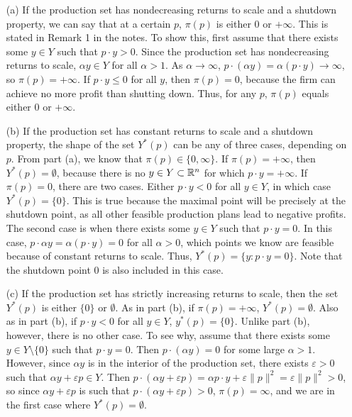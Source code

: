 \documentclass[12pt]{article}
\begin{document}
\begin{itemize}
    \item[(a)] If the production set has nondecreasing returns to scale and a shutdown property, we can say that at a certain $p$, $\pi(p)$ is either 0 or $+\infty$. This is stated in Remark 1 in the notes. To show this, first assume that there exists some $y \in Y$ such that $p \cdot y > 0$. Since the production set has nondecreasing returns to scale, $\alpha y \in Y$ for all $\alpha > 1$. As $\alpha \to \infty$, $p \cdot( \alpha y) = \alpha (p \cdot y) \to \infty$, so $\pi(p) = +\infty$. If $p \cdot y \le 0$ for all $y$, then $\pi(p) = 0$, because the firm can achieve no more profit than shutting down. Thus, for any $p$, $\pi(p)$ equals either 0 or $+\infty$.

    \item[(b)] If the production set has constant returns to scale and a shutdown property, the shape of the set $Y^*(p)$ can be any of three cases, depending on $p$. From part (a), we know that $\pi(p) \in \{0,\infty\}$. If $\pi(p) = +\infty$, then $Y^*(p) = \emptyset$, because there is no $y \in Y \subset \mathbb{R}^n$ for which $p\cdot y = +\infty$. If $\pi(p) = 0$, there are two cases. Either $p \cdot y < 0$ for all $y \in Y$, in which case $Y^*(p) = \{0\}$. This is true because the maximal point will be precisely at the shutdown point, as all other feasible production plans lead to negative profits. The second case is when there exists some $y \in Y$ such that $p \cdot y = 0$. In this case, $p \cdot \alpha y = \alpha (p \cdot y) = 0$ for all $\alpha > 0$, which points we know are feasible because of constant returns to scale. Thus, $Y^*(p) = \{y : p \cdot y = 0\}$. Note that the shutdown point 0 is also included in this case.

    \item[(c)] If the production set has strictly increasing returns to scale, then the set $Y^*(p)$ is either $\{0\}$ or $\emptyset$. As in part (b), if $\pi(p) = +\infty$, $Y^*(p) = \emptyset$. Also as in part (b), if $p \cdot y < 0$ for all $y \in Y$, $y^*(p) = \{0\}$. Unlike part (b), however, there is no other case. To see why, assume that there exists some $y \in Y \setminus \{0\}$ such that $p \cdot y = 0$. Then $p \cdot (\alpha y) = 0$ for some large $\alpha > 1$. However, since $\alpha y$ is in the interior of the production set, there exists $\varepsilon > 0$ such that $\alpha y + \varepsilon p \in Y$. Then $p \cdot (\alpha y + \varepsilon p) = \alpha p \cdot y + \varepsilon \|p\|^2 = \varepsilon \|p\|^2 > 0$, so since $\alpha y + \varepsilon p$ is such that $p\cdot (\alpha y + \varepsilon p) > 0$, $\pi(p) = \infty$, and we are in the first case where $Y^*(p) = \emptyset$.


\end{itemize}
\end{document}

